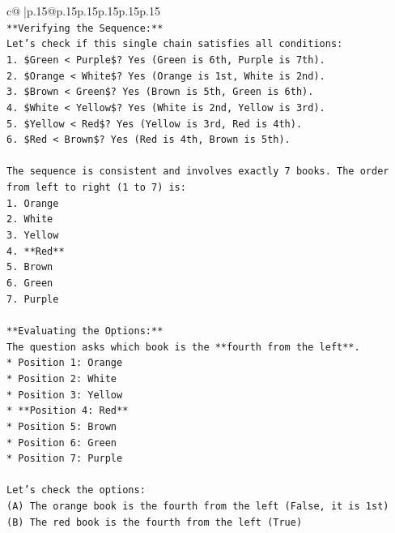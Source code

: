 \documentclass{article}
\begin{document}
{\begin{supertabular}{c@{$\;$}|p{.15\linewidth}@{}p{.15\linewidth}p{.15\linewidth}p{.15\linewidth}p{.15\linewidth}p{.15\linewidth}}
{{{\\ 
\texttt{**Verifying the Sequence:**} \\
\texttt{Let's check if this single chain satisfies all conditions:} \\
\texttt{1.  \$Green < Purple\$? Yes (Green is 6th, Purple is 7th).} \\
\texttt{2.  \$Orange < White\$? Yes (Orange is 1st, White is 2nd).} \\
\texttt{3.  \$Brown < Green\$? Yes (Brown is 5th, Green is 6th).} \\
\texttt{4.  \$White < Yellow\$? Yes (White is 2nd, Yellow is 3rd).} \\
\texttt{5.  \$Yellow < Red\$? Yes (Yellow is 3rd, Red is 4th).} \\
\texttt{6.  \$Red < Brown\$? Yes (Red is 4th, Brown is 5th).} \\
\\ 
\texttt{The sequence is consistent and involves exactly 7 books. The order from left to right (1 to 7) is:} \\
\texttt{1.  Orange} \\
\texttt{2.  White} \\
\texttt{3.  Yellow} \\
\texttt{4.  **Red**} \\
\texttt{5.  Brown} \\
\texttt{6.  Green} \\
\texttt{7.  Purple} \\
\\ 
\texttt{**Evaluating the Options:**} \\
\texttt{The question asks which book is the **fourth from the left**.} \\
\texttt{*   Position 1: Orange} \\
\texttt{*   Position 2: White} \\
\texttt{*   Position 3: Yellow} \\
\texttt{*   **Position 4: Red**} \\
\texttt{*   Position 5: Brown} \\
\texttt{*   Position 6: Green} \\
\texttt{*   Position 7: Purple} \\
\\ 
\texttt{Let's check the options:} \\
\texttt{(A) The orange book is the fourth from the left (False, it is 1st)} \\
\texttt{(B) The red book is the fourth from the left (True)} \\
}}}
\end{supertabular}}
\end{document}

